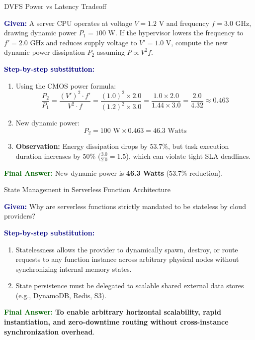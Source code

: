 \documentclass[11pt,a4paper,openany]{report}
\newcommand{\Given}{\par\textbf{\textcolor{navy}{Given:}} }
\newcommand{\Steps}{\par\textbf{\textcolor{navy}{Step-by-step substitution:}}\par}
\newcommand{\Answer}{\par\textbf{\textcolor{darkgreen}{Final Answer:}} }
\begin{document}
\begin{solved}{DVFS Power vs Latency Tradeoff}
\Given A server CPU operates at voltage $V = 1.2\text{ V}$ and frequency $f = 3.0\text{ GHz}$, drawing dynamic power $P_1 = 100\text{ W}$. If the hypervisor lowers the frequency to $f' = 2.0\text{ GHz}$ and reduces supply voltage to $V' = 1.0\text{ V}$, compute the new dynamic power dissipation $P_2$ assuming $P \propto V^2 f$.
\Steps
\begin{enumerate}[leftmargin=*]
  \item Using the CMOS power formula:
  \begin{equation}
  \frac{P_2}{P_1} = \frac{(V')^2 \cdot f'}{V^2 \cdot f} = \frac{(1.0)^2 \times 2.0}{(1.2)^2 \times 3.0} = \frac{1.0 \times 2.0}{1.44 \times 3.0} = \frac{2.0}{4.32} \approx 0.463
  \end{equation}
  \item New dynamic power:
  \begin{equation}
  P_2 = 100\text{ W} \times 0.463 = 46.3\text{ Watts}
  \end{equation}
  \item \textbf{Observation:} Energy dissipation drops by $53.7\%$, but task execution duration increases by $50\%$ ($\frac{3.0}{2.0} = 1.5$), which can violate tight SLA deadlines.
\end{enumerate}
\Answer New dynamic power is \textbf{46.3 Watts} ($53.7\%$ reduction).
\end{solved}

\begin{solved}{State Management in Serverless Function Architecture}
\Given Why are serverless functions strictly mandated to be stateless by cloud providers?
\Steps
\begin{enumerate}[leftmargin=*]
  \item Statelessness allows the provider to dynamically spawn, destroy, or route requests to any function instance across arbitrary physical nodes without synchronizing internal memory states.
  \item State persistence must be delegated to scalable shared external data stores (e.g., DynamoDB, Redis, S3).
\end{enumerate}
\Answer \textbf{To enable arbitrary horizontal scalability, rapid instantiation, and zero-downtime routing without cross-instance synchronization overhead}.
\end{solved}
\end{document}
